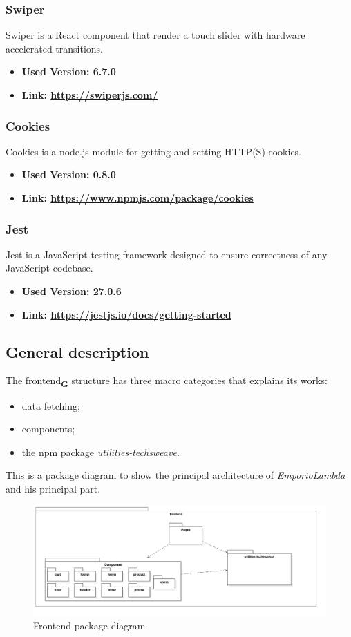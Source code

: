 \subsubsection{Swiper}
Swiper is a React component that render a touch slider with hardware accelerated transitions.
\begin{itemize}
  \item \textbf{Used Version: 6.7.0}
  \item \textbf{Link: \url{https://swiperjs.com/}}
\end{itemize}
\subsubsection{Cookies}
Cookies is a node.js module for getting and setting HTTP(S) cookies.
\begin{itemize}
  \item \textbf{Used Version: 0.8.0}
  \item \textbf{Link: \url{https://www.npmjs.com/package/cookies}}
\end{itemize}
\subsubsection{Jest}
Jest is a JavaScript testing framework designed to ensure correctness of any JavaScript codebase.
\begin{itemize}
  \item \textbf{Used Version: 27.0.6}
  \item \textbf{Link: \url{https://jestjs.io/docs/getting-started}}
\end{itemize}

\subsection{General description}
The frontend\textsubscript{\textbf{G}} structure has three macro categories that explains its works:
\begin{itemize}
  \item data fetching;
  \item components;
  \item the npm package \textit{utilities-techsweave}.
\end{itemize}

This is a package diagram to show the principal architecture of \textit{EmporioLambda} and his principal part.
\begin{figure}[!ht]
  \caption{Frontend package diagram}
  \vspace{10px}
  \includegraphics[scale=0.39]{../../../../Images/Diagrammi/maintainerManual/FE/FEgraph.png}
  \centering
\end{figure}

